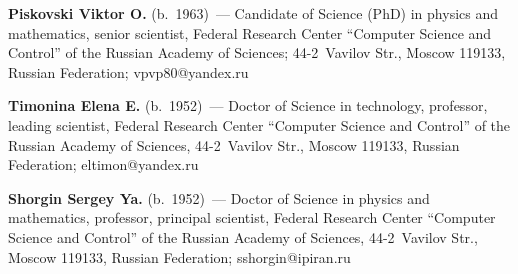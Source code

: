 \vspace*{4pt}

\noindent
\textbf{Piskovski Viktor O.} (b.\ 1963)~--- Candidate of Science (PhD) in physics and 
mathematics, senior scientist, Federal Research Center ``Computer Science  and 
Control'' of the Russian Academy of Sciences; 44-2~Vavilov Str., Moscow 119133, 
Russian Federation; \mbox{vpvp80@yandex.ru}

\vspace*{4pt}

\noindent
\textbf{Timonina Elena E.} (b.\ 1952)~--- Doctor of Science in technology, professor, 
leading scientist, Federal Research Center ``Computer Science and Control'' of the 
Russian Academy of Sciences, 44-2~Vavilov Str., Moscow 119133, Russian Federation; 
\mbox{eltimon@yandex.ru}

\vspace*{3pt}

\noindent
\textbf{Shorgin Sergey Ya.} (b.\ 1952)~--- Doctor of Science in physics and 
mathematics, professor, principal scientist, Federal Research Center ``Computer Science 
and Control'' of the Russian Academy of Sciences, 44-2~Vavilov Str., Moscow 119133, 
Russian Federation; \mbox{sshorgin@ipiran.ru}



\label{end\stat}

\renewcommand{\bibname}{\protect\rm Литература} 